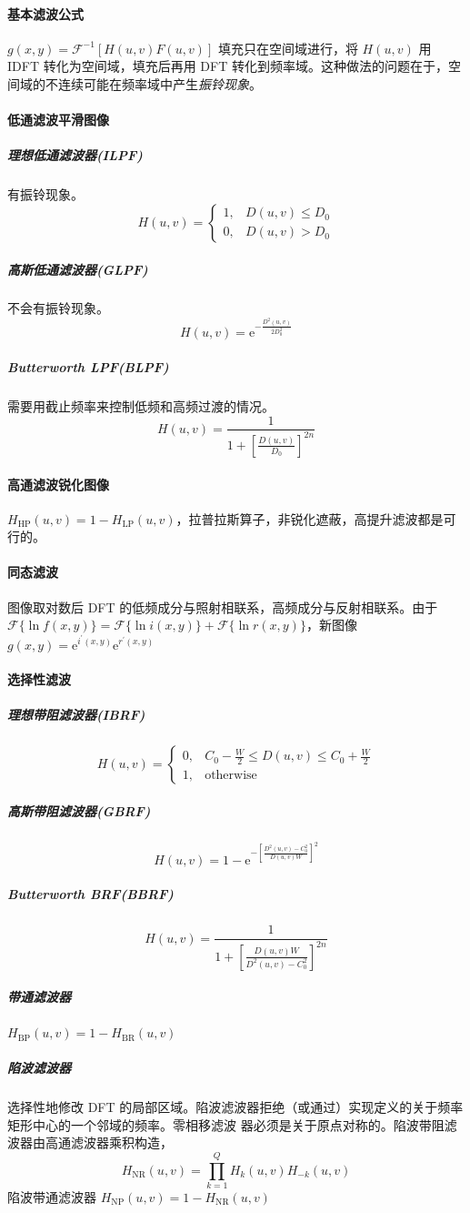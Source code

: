 \documentclass[twocolumn]{ctexart}
\def\ee{\mathrm{e}}
\begin{document}
\paragraph{基本滤波公式} $g(x,y)=\mathcal{F}^{-1}[H(u,v)F(u,v)]$ 填充只在空间域进行，将 $H(u,v)$ 用 IDFT 转化为空间域，填充后再⽤ DFT 转化到频率域。这种做法的问题在于，空间域的不连续可能在频率域中产⽣\emph{振铃现象}。
\paragraph{低通滤波平滑图像}
\subparagraph{理想低通滤波器(ILPF)} 有振铃现象。
\begin{equation*}
    H(u,v)=\begin{cases}
        1, & D(u,v)\leq D_0\\ 0, & D(u,v)>D_0
    \end{cases}
\end{equation*}
\subparagraph{高斯低通滤波器(GLPF)} 不会有振铃现象。$$H(u,v)=\ee^{-\frac{D^2(u,v)}{2D_0^2}}$$
\subparagraph{Butterworth LPF(BLPF)} 需要用截止频率来控制低频和高频过渡的情况。
$$H(u,v)=\frac{1}{1+\left[\frac{D(u,v)}{D_0}\right]^{2n}}$$
\paragraph{高通滤波锐化图像}
$H_\text{HP}(u,v)=1-H_\text{LP}(u,v)$，拉普拉斯算子，非锐化遮蔽，高提升滤波都是可行的。
\paragraph{同态滤波} 图像取对数后 DFT 的低频成分与照射相联系，⾼频成分与反射相联系。由于$\mathcal{F}\{\ln f(x,y)\}=\mathcal{F}\{\ln i(x,y)\}+\mathcal{F}\{\ln r(x,y)\}$，新图像$g(x,y)=\ee^{i^\prime(x,y)}\ee^{r^\prime(x,y)}$
\paragraph{选择性滤波} 
\subparagraph{理想带阻滤波器(IBRF)}
\begin{equation*}
    H(u,v)=\begin{cases}
        0, & C_0-\frac{W}{2}\leq D(u,v)\leq C_0+\frac{W}{2}\\ 1, & \text{otherwise}
    \end{cases}
\end{equation*}
\subparagraph{高斯带阻滤波器(GBRF)}
$$H(u,v)=1-\ee^{-\left[\frac{D^2(u,v)-C_0^2}{D(u,v)W}\right]^2}$$
\subparagraph{Butterworth BRF(BBRF)}
$$H(u,v)=\frac{1}{1+\left[\frac{D(u,v)W}{D^2(u,v)-C_0^2}\right]^{2n}}$$
\subparagraph{带通滤波器} $H_\text{BP}(u,v)=1-H_\text{BR}(u,v)$
\subparagraph{陷波滤波器} 选择性地修改 DFT 的局部区域。陷波滤波器拒绝（或通过）实现定义的关于频率矩形中⼼的⼀个邻域的频率。零相移滤波
器必须是关于原点对称的。陷波带阻滤波器由高通滤波器乘积构造，
$$H_\text{NR}(u,v)=\prod_{k=1}^Q H_k(u,v)H_{-k}(u,v)$$
陷波带通滤波器 $H_\text{NP}(u,v)=1-H_\text{NR}(u,v)$
\end{document}
